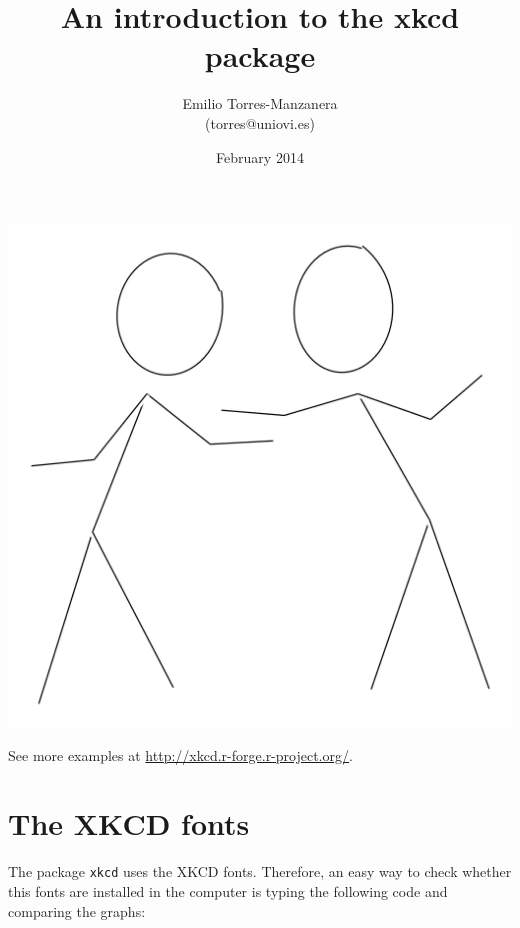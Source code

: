 \documentclass[10pt]{article}
\title{An introduction to the xkcd package}
\author{Emilio Torres-Manzanera\\ (torres@uniovi.es)}
\date{February 2014}
\begin{document}




\maketitle

\begin{abstract}
    
    \end{abstract}

\begin{center}
\includegraphics{xkcd-intro-twoman}

\end{center}
\tableofcontents

\bigskip

See more examples at \url{http://xkcd.r-forge.r-project.org/}.

\section{The XKCD fonts}

The package \texttt{xkcd} uses the XKCD fonts. Therefore, an easy way to check whether this fonts are installed in the computer is typing the following code and comparing the graphs:
\end{document}
